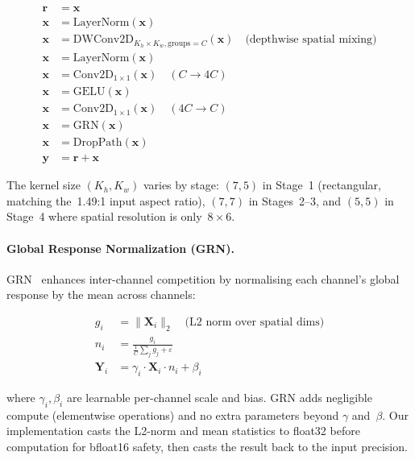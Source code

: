 \documentclass{article}
\begin{document}
\begin{align}
  \mathbf{r} &= \mathbf{x} \label{eq:residual}\\
  \mathbf{x} &= \text{LayerNorm}(\mathbf{x}) \label{eq:norm1}\\
  \mathbf{x} &= \text{DWConv2D}_{K_h\times K_w, \text{groups}=C}(\mathbf{x}) \quad
  \text{(depthwise spatial mixing)} \label{eq:dwconv}\\
  \mathbf{x} &= \text{LayerNorm}(\mathbf{x}) \label{eq:norm2}\\
  \mathbf{x} &= \text{Conv2D}_{1\times1}(\mathbf{x}) \quad (C \rightarrow 4C) \label{eq:expand}\\
  \mathbf{x} &= \text{GELU}(\mathbf{x}) \label{eq:gelu}\\
  \mathbf{x} &= \text{Conv2D}_{1\times1}(\mathbf{x}) \quad (4C \rightarrow C) \label{eq:project}\\
  \mathbf{x} &= \text{GRN}(\mathbf{x}) \label{eq:grn}\\
  \mathbf{x} &= \text{DropPath}(\mathbf{x}) \label{eq:droppath}\\
  \mathbf{y} &= \mathbf{r} + \mathbf{x} \label{eq:output}
\end{align}

The kernel size $(K_h, K_w)$ varies by stage: $(7,5)$ in Stage~1 (rectangular,
matching the~1.49:1 input aspect ratio), $(7,7)$ in Stages~2--3, and $(5,5)$ in
Stage~4 where spatial resolution is only~$8\times6$.

\paragraph{Global Response Normalization (GRN).}
GRN~\cite{woo2023convnextv2} enhances inter-channel competition by
normalising each channel's global response by the mean across channels:

\begin{align}
  g_i &= \|\mathbf{X}_i\|_2 \quad \text{(L2 norm over spatial dims)} \label{eq:grn_norm}\\
  n_i &= \frac{g_i}{\frac{1}{C}\sum_{j} g_j + \varepsilon} \label{eq:grn_ratio}\\
  \mathbf{Y}_i &= \gamma_i \cdot \mathbf{X}_i \cdot n_i + \beta_i \label{eq:grn_apply}
\end{align}

where $\gamma_i, \beta_i$ are learnable per-channel scale and bias. GRN adds
negligible compute (elementwise operations) and no extra parameters beyond
$\gamma$ and~$\beta$. Our implementation casts the L2-norm and mean statistics
to float32 before computation for bfloat16 safety, then casts the result back
to the input precision.
\end{document}

